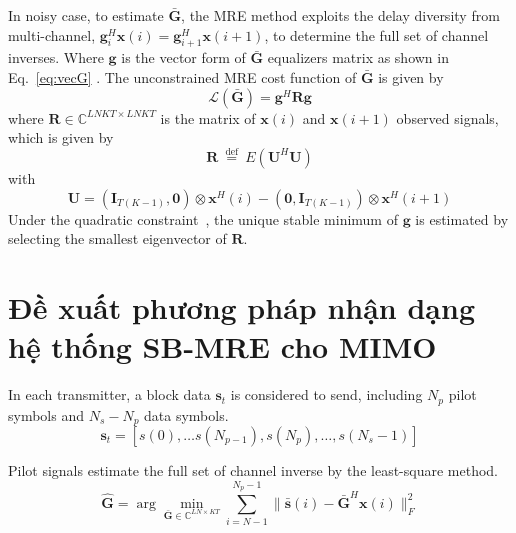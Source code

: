 In noisy case, to estimate $\bar{\mathbf{G}}$, the MRE method exploits the delay diversity from multi-channel, $\mathbf{g}_i^H \mathbf{x}(i) = \mathbf{g}_{i+1}^H \mathbf{x}(i+1)$, to determine the full set of channel inverses. Where $\mathbf{g}$ is the vector form of $\bar{\mathbf{G}}$ equalizers matrix as shown in Eq.~\ref{eq:vecG} . The unconstrained MRE cost function of $\bar{\mathbf{G}}$ is given by
\begin{equation}
    \mathcal{L}(\bar{\mathbf{G}})=\mathbf{g}^H \mathbf{R} \mathbf{g}
\end{equation}
where $\mathbf{R} \in \mathbb{C}^{LNKT \times LNKT}$ is the matrix of $\mathbf{x}(i)$ and $\mathbf{x}(i+1)$ observed signals, which is given by
\begin{equation}
\label{eq:R}
\mathbf{R} \stackrel{\text { def }}{=} E\left(\mathbf{U}^{H} \mathbf{U}\right)
\end{equation}
with
\begin{equation}
\label{eq:U}
\mathbf{U} = \left(\mathbf{I}_{T (K-1)}, \mathbf{0}\right) \otimes \mathbf{x}^{H}(i)-\left(\mathbf{0}, \mathbf{I}_{T (K-1)}\right) \otimes \mathbf{x}^{H}(i+1)
\end{equation}
Under the quadratic constraint~\cite{original}, the unique stable minimum of $\mathbf{g}$ is estimated by selecting the smallest eigenvector of $\mathbf{R}$.


\section{Đề xuất phương pháp nhận dạng hệ thống SB-MRE cho MIMO}


In each transmitter, a block data $\mathbf{s}_t$ is considered to send, including $N_p$ pilot symbols and $N_s - N_p$ data symbols.
\begin{equation}
\mathbf{s}_t = \left[s(0), \ldots s\left(N_{p-1}\right), s\left(N_p\right), \ldots, s\left(N_s-1\right)\right]
\end{equation}

Pilot signals estimate the full set of channel inverse by the least-square method.
\begin{equation}
    \hat{\mathbf{G}} = \arg \underset{\bar{\mathbf{G}} \in \mathbb{C}^{LN \times KT}}{\min} \sum_{i=N-1}^{N_{p} - 1}\|\bar{\mathbf{s}}(i)- \bar{\mathbf{G}}^H \mathbf{x}(i)\|_F^2 
\end{equation}


